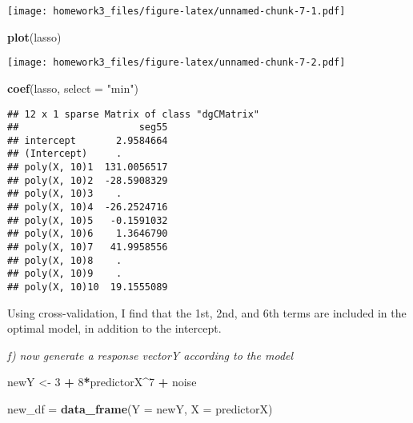 \documentclass[
]{article}
\newenvironment{Shaded}{\begin{snugshade}}{\end{snugshade}}
\newcommand{\CommentTok}[1]{\textcolor[rgb]{0.56,0.35,0.01}{\textit{#1}}}
\newcommand{\DataTypeTok}[1]{\textcolor[rgb]{0.13,0.29,0.53}{#1}}
\newcommand{\DecValTok}[1]{\textcolor[rgb]{0.00,0.00,0.81}{#1}}
\newcommand{\KeywordTok}[1]{\textcolor[rgb]{0.13,0.29,0.53}{\textbf{#1}}}
\newcommand{\NormalTok}[1]{#1}
\newcommand{\OperatorTok}[1]{\textcolor[rgb]{0.81,0.36,0.00}{\textbf{#1}}}
\newcommand{\StringTok}[1]{\textcolor[rgb]{0.31,0.60,0.02}{#1}}
\begin{document}
\begin{Shaded}
\end{Shaded}

\texttt{[image: homework3\_files/figure-latex/unnamed-chunk-7-1.pdf]}

\begin{Shaded}
\begin{Highlighting}[]
\KeywordTok{plot}\NormalTok{(lasso)}
\end{Highlighting}
\end{Shaded}

\texttt{[image: homework3\_files/figure-latex/unnamed-chunk-7-2.pdf]}

\begin{Shaded}
\begin{Highlighting}[]
\KeywordTok{coef}\NormalTok{(lasso, }\DataTypeTok{select =} \StringTok{"min"}\NormalTok{)}
\end{Highlighting}
\end{Shaded}

\begin{verbatim}
## 12 x 1 sparse Matrix of class "dgCMatrix"
##                     seg55
## intercept       2.9584664
## (Intercept)     .        
## poly(X, 10)1  131.0056517
## poly(X, 10)2  -28.5908329
## poly(X, 10)3    .        
## poly(X, 10)4  -26.2524716
## poly(X, 10)5   -0.1591032
## poly(X, 10)6    1.3646790
## poly(X, 10)7   41.9958556
## poly(X, 10)8    .        
## poly(X, 10)9    .        
## poly(X, 10)10  19.1555089
\end{verbatim}

Using cross-validation, I find that the 1st, 2nd, and 6th terms are
included in the optimal model, in addition to the intercept.

\emph{f)} \emph{now generate a response vectorY according to the model}

\begin{Shaded}
\begin{Highlighting}[]
\NormalTok{newY <-}\StringTok{ }\DecValTok{3} \OperatorTok{+}\StringTok{ }\DecValTok{8}\OperatorTok{*}\NormalTok{predictorX}\OperatorTok{^}\DecValTok{7} \OperatorTok{+}\StringTok{ }\NormalTok{noise}

\NormalTok{new_df =}\StringTok{ }\KeywordTok{data_frame}\NormalTok{(}\DataTypeTok{Y =}\NormalTok{ newY, }\DataTypeTok{X =}\NormalTok{ predictorX)}
\end{Highlighting}
\end{Shaded}
\end{document}
